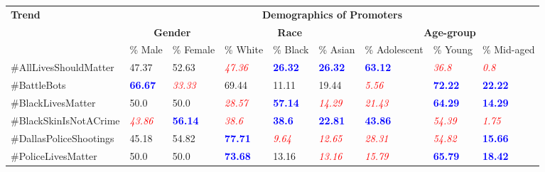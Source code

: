 \documentclass[letterpaper]{article}
\begin{document}
\begin{table*}[t]
\center
\small
\begin{tabular}{|p{}|p{}|p{}||p{}|p{}|p{}||p{}|p{}|p{}|}
\hline
\multirow{3}{*}{\bf Trend} & \multicolumn{8}{c|}{\bf Demographics of Promoters} \\
\cline{2-9}
~ & \multicolumn{2}{c||}{\bf Gender}  & \multicolumn{3}{c||}{\bf Race} & \multicolumn{3}{c|}{\bf Age-group} \\
\cline{2-9}
~ & \% Male & \% Female & \% White & \% Black & \% Asian & \% Adolescent & \% Young & \% Mid-aged \\
\hline
\#AllLivesShouldMatter & 47.37 & 52.63 &  \textcolor{red}{\it 47.36} & \textcolor{blue}{\bf 26.32} & \textcolor{blue}{\bf 26.32} &  \textcolor{blue}{\bf 63.12} & \textcolor{red}{\it 36.8} & \textcolor{red}{\it 0.8} \\
\hline
\#BattleBots & \textcolor{blue}{\bf 66.67} & \textcolor{red}{\it 33.33} &  69.44 & 11.11 & 19.44 &  \textcolor{red}{\it 5.56} & \textcolor{blue}{\bf 72.22} & \textcolor{blue}{\bf 22.22} \\
\hline
\#BlackLivesMatter & 50.0 & 50.0 &  \textcolor{red}{\it 28.57} & \textcolor{blue}{\bf 57.14} & \textcolor{red}{\it 14.29} &  \textcolor{red}{\it 21.43} & \textcolor{blue}{\bf 64.29} & \textcolor{blue}{\bf 14.29}  \\
\hline
\#BlackSkinIsNotACrime & \textcolor{red}{\it 43.86} & \textcolor{blue}{\bf 56.14} &  \textcolor{red}{\it 38.6} & \textcolor{blue}{\bf 38.6} & \textcolor{blue}{\bf 22.81} &  \textcolor{blue}{\bf 43.86} & \textcolor{red}{\it 54.39} & \textcolor{red}{\it 1.75}  \\
\hline
\#DallasPoliceShootings & 45.18 & 54.82 &  \textcolor{blue}{\bf 77.71} & \textcolor{red}{\it 9.64} & \textcolor{red}{\it 12.65} &  \textcolor{red}{\it 28.31} & \textcolor{red}{\it 54.82} & \textcolor{blue}{\bf 15.66}  \\
\hline
\#PoliceLivesMatter & 50.0 & 50.0 &  \textcolor{blue}{\bf 73.68} & 13.16 & \textcolor{red}{\it 13.16} &  \textcolor{red}{\it 15.79} & \textcolor{blue}{\bf 65.79} & \textcolor{blue}{\bf 18.42}  \\

\end{tabular}
\end{table*}
\end{document}
